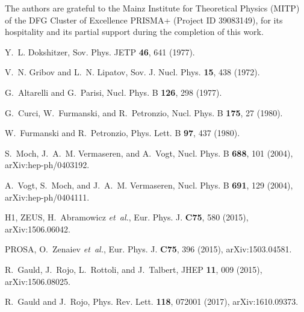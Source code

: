\documentclass[12pt]{article}
\begin{document}
The authors are grateful to the Mainz Institute for Theoretical Physics (MITP)
of the DFG Cluster of Excellence PRISMA+ (Project ID 39083149), for its
hospitality and its partial support during the completion of this work.



\clearpage
%
%
%

\begin{thebibliography}{99}

Y.~L. Dokshitzer,
\newblock Sov. Phys. JETP {\bf 46}, 641 (1977).

V.~N. Gribov and L.~N. Lipatov,
\newblock Sov. J. Nucl. Phys. {\bf 15}, 438 (1972).

G.~Altarelli and G.~Parisi,
\newblock Nucl. Phys. B {\bf 126}, 298 (1977).

G.~Curci, W.~Furmanski, and R.~Petronzio,
\newblock Nucl. Phys. B {\bf 175}, 27 (1980).

W.~Furmanski and R.~Petronzio,
\newblock Phys. Lett. B {\bf 97}, 437 (1980).

S.~Moch, J.~A.~M. Vermaseren, and A.~Vogt,
\newblock Nucl. Phys. B {\bf 688}, 101 (2004), arXiv:hep-ph/0403192.

A.~Vogt, S.~Moch, and J.~A.~M. Vermaseren,
\newblock Nucl. Phys. B {\bf 691}, 129 (2004), arXiv:hep-ph/0404111.

H1, ZEUS, H.~Abramowicz {\em et~al.},
\newblock Eur. Phys. J. {\bf C75}, 580 (2015), arXiv:1506.06042.

PROSA, O.~Zenaiev {\em et~al.},
\newblock Eur. Phys. J. {\bf C75}, 396 (2015), arXiv:1503.04581.

R.~Gauld, J.~Rojo, L.~Rottoli, and J.~Talbert,
\newblock JHEP {\bf 11}, 009 (2015), arXiv:1506.08025.

R.~Gauld and J.~Rojo,
\newblock Phys. Rev. Lett. {\bf 118}, 072001 (2017), arXiv:1610.09373.


\end{thebibliography}
\end{document}
